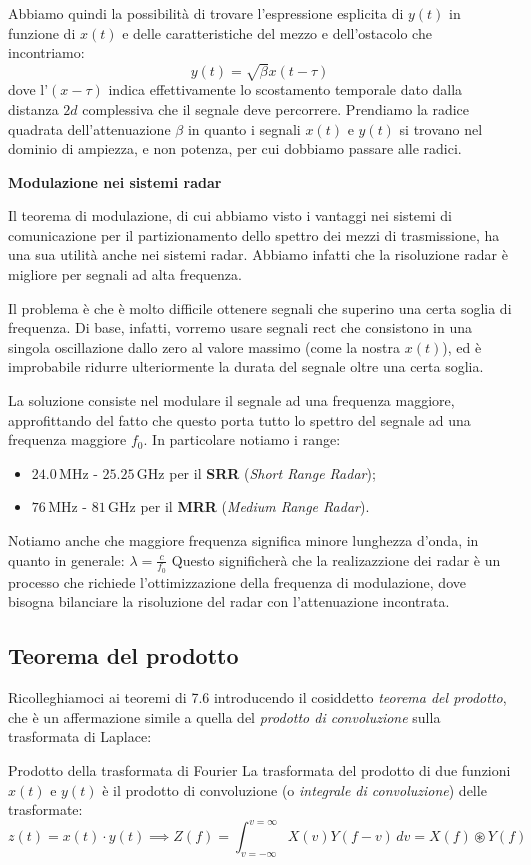 \documentclass[a4paper,11pt]{article}
\begin{document}
Abbiamo quindi la possibilità di trovare l'espressione esplicita di $y(t)$ in funzione di $x(t)$ e delle caratteristiche del mezzo e dell'ostacolo che incontriamo:
$$
y(t) = \sqrt{\beta} x(t - \tau)
$$
dove l'$(x - \tau)$ indica effettivamente lo scostamento temporale dato dalla distanza $2d$ complessiva che il segnale deve percorrere. Prendiamo la radice quadrata dell'attenuazione $\beta$ in quanto i segnali $x(t)$ e $y(t)$ si trovano nel dominio di ampiezza, e non potenza, per cui dobbiamo passare alle radici.

\par\smallskip

\noindent
\textbf{\textsf{Modulazione nei sistemi radar}}

\noindent
Il teorema di modulazione, di cui abbiamo visto i vantaggi nei sistemi di comunicazione per il partizionamento dello spettro dei mezzi di trasmissione, ha una sua utilità anche nei sistemi radar. Abbiamo infatti che la risoluzione radar è migliore per segnali ad alta frequenza.

Il problema è che è molto difficile ottenere segnali che superino una certa soglia di frequenza. Di base, infatti, vorremo usare segnali $\mathrm{rect}$ che consistono in una singola oscillazione dallo zero al valore massimo (come la nostra $x(t)$), ed è improbabile ridurre ulteriormente la durata del segnale oltre una certa soglia.

La soluzione consiste nel modulare il segnale ad una frequenza maggiore, approfittando del fatto che questo porta tutto lo spettro del segnale ad una frequenza maggiore $f_0$.
In particolare notiamo i range:
\begin{itemize}
	\item $24.0 \, \mathrm{MHz}$ - $25.25 \, \mathrm{GHz}$ per il \textbf{SRR} (\textit{Short Range Radar});
	\item $76 \, \mathrm{MHz}$ - $81 \, \mathrm{GHz}$ per il \textbf{MRR} (\textit{Medium Range Radar}).
\end{itemize}

Notiamo anche che maggiore frequenza significa minore lunghezza d'onda, in quanto in generale:
$
\lambda = \frac{c}{f_0}
$
Questo significherà che la realizazzione dei radar è un processo che richiede l'ottimizzazione della frequenza di modulazione, dove bisogna bilanciare la risoluzione del radar con l'attenuazione incontrata.

\subsection{Teorema del prodotto}
Ricolleghiamoci ai teoremi di 7.6 introducendo il cosiddetto \textit{teorema del prodotto}, che è un affermazione simile a quella del \textit{prodotto di convoluzione} sulla trasformata di Laplace:
\begin{theorem}{Prodotto della trasformata di Fourier}
	La trasformata del prodotto di due funzioni $x(t)$ e $y(t)$ è il prodotto di convoluzione (o \textit{integrale di convoluzione}) delle trasformate:
$$
z(t) = x(t) \cdot y(t) \implies Z(f) = \int_{v=-\infty}^{v=\infty} X(v) Y(f - v) \, dv = X(f) \circledast Y(f)
$$
\end{theorem}
\end{document}
